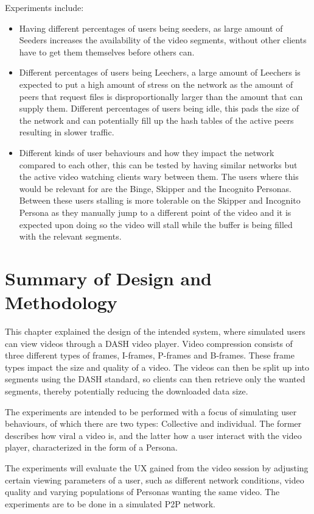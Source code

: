 Experiments include:
\begin{itemize}
\item Having different percentages of users being seeders, as large amount of Seeders increases the availability of the video segments, without other clients have to get them themselves before others can.

\item Different percentages of users being Leechers, a large amount of Leechers is expected to put a high amount of stress on the network as the amount of peers that request files is disproportionally larger than the amount that can supply them.
Different percentages of users being idle, this pads the size of the network and can potentially fill up the hash tables of the active peers resulting in slower traffic.

\item Different kinds of user behaviours and how they impact the network compared to each other, this can be tested by having similar networks but the active video watching clients wary between them. The users where this would be relevant for are the Binge, Skipper and the Incognito Personas. Between these users stalling is more tolerable on the Skipper and Incognito Persona as they manually jump to a different point of the video and it is expected upon doing so the video will stall while the buffer is being filled with the relevant segments.
\end{itemize}

\section{Summary of Design and Methodology}
This chapter explained the design of the intended system, where simulated users can view videos through a \ac{DASH} video player. Video compression consists of three different types of frames, \acp{I-frame}, \acp{P-frame} and \acp{B-frame}. These frame types impact the size and quality of a video. The videos can then be split up into segments using the \ac{DASH} standard, so clients can then retrieve only the wanted segments, thereby potentially reducing the downloaded data size.

The experiments are intended to be performed with a focus of simulating user behaviours, of which there are two types: Collective and individual. The former describes how viral a video is, and the latter how a user interact with the video player, characterized in the form of a Persona.

The experiments will evaluate the \ac{UX} gained from the video session by adjusting certain viewing parameters of a user, such as different network conditions, video quality and varying populations of Personas wanting the same video. The experiments are to be done in a simulated \ac{P2P} network.

